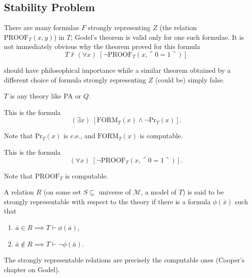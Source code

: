 \subsection{Stability Problem}

\begin{goal}[Mostowski, 1996]
  There are many formulae $F$ strongly representing $Z$ (the relation
  $\text{PROOF}_T(x,y)$) in $T$; Godel's theorem is valid only for one such
  formulae. It is not immediately obvious why the theorem proved for this
  formula
  \[T \not\vdash (\forall x)\; [\neg\text{PROOF}_T(x, \ulcorner
  0=1\urcorner)]\]

  should have philosophical importance while a similar theorem obtained by
  a different choice of formula strongly representing $Z$ (could be) simply
  false.
\end{goal}

\begin{notation}
  $T$ is any theory like PA or $Q$.
\end{notation}

\begin{definition}[CON(T)]
  This is the formula
  \[(\exists x)\; [\text{FORM}_T(x) \wedge \neg\text{Pr}_T(x)].\]

  Note that $\text{Pr}_T(x)$ is c.e., and $\text{FORM}_T(x)$ is computable.
\end{definition}

\begin{definition}[CON'(T)]
  This is the formula
  \[(\forall x)\; [\neg\text{PROOF}_T(x, \ulcorner 0=1\urcorner)].\]

  Note that $\text{PROOF}_T$ is computable.
\end{definition}

\begin{definition}
  A relation $R$ (on some set $S \subseteq$ universe of $\mathcal{M}$, a
  model of $T$) is said to be strongly representable with respect to the
  theory if there is a formula $\phi(\bar{x})$ such that 

  \begin{enumerate}
    \item $\bar{a}\in R \implies T\vdash \phi(\bar{a})$,
    \item $\bar{a}\not\in R \implies T\vdash \neg\phi(\bar{a})$.
  \end{enumerate}
\end{definition}

\begin{fact}
  The strongly representable relations are precisely the computable ones
  (Cooper's chapter on Godel).
\end{fact}

